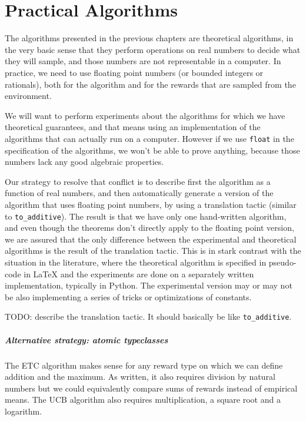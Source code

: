 \chapter{Practical Algorithms}

The algorithms presented in the previous chapters are theoretical algorithms, in the very basic sense that they perform operations on real numbers to decide what they will sample, and those numbers are not representable in a computer. In practice, we need to use floating point numbers (or bounded integers or rationals), both for the algorithm and for the rewards that are sampled from the environment.

We will want to perform experiments about the algorithms for which we have theoretical guarantees, and that means using an implementation of the algorithms that can actually run on a computer.
However if we use \texttt{float} in the specification of the algorithms, we won't be able to prove anything, because those numbers lack any good algebraic properties.

Our strategy to resolve that conflict is to describe first the algorithm as a function of real numbers, and then automatically generate a version of the algorithm that uses floating point numbers, by using a translation tactic (similar to \texttt{to\_additive}).
The result is that we have only one hand-written algorithm, and even though the theorems don't directly apply to the floating point version, we are assured that the only difference between the experimental and theoretical algorithms is the result of the translation tactic.
This is in stark contrast with the situation in the literature, where the theoretical algorithm is specified in pseudo-code in LaTeX and the experiments are done on a separately written implementation, typically in Python. The experimental version may or may not be also implementing a series of tricks or optimizations of constants.

TODO: describe the translation tactic. It should basically be like \texttt{to\_additive}.


\paragraph{Alternative strategy: atomic typeclasses}

The ETC algorithm makes sense for any reward type on which we can define addition and the maximum.
As written, it also requires division by natural numbers but we could equivalently compare sums of rewards instead of empirical means. The UCB algorithm also requires multiplication, a square root and a logarithm.

